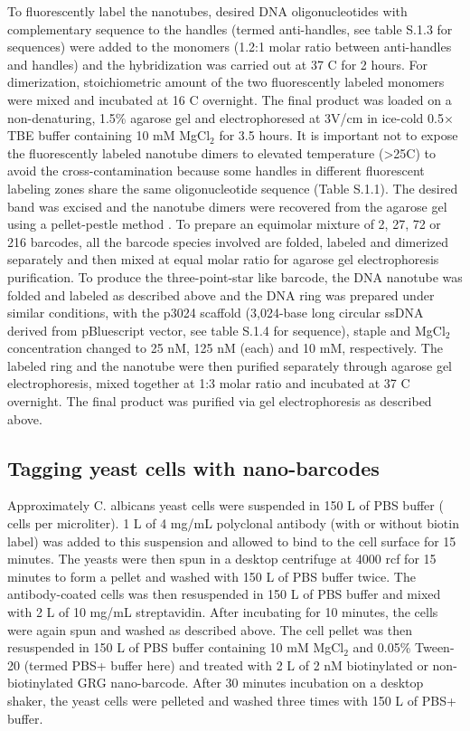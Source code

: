  To fluorescently label the nanotubes, desired DNA oligonucleotides with complementary sequence to the handles (termed anti-handles, see table S.1.3 for sequences) were added to the monomers (1.2:1 molar ratio between anti-handles and handles) and the hybridization was carried out at 37 \textdegree C for 2 hours. For dimerization, stoichiometric amount of the two fluorescently labeled monomers were mixed and incubated at 16 \textdegree C overnight. The final product was loaded on a non-denaturing, 1.5\% agarose gel and electrophoresed at 3V/cm in ice-cold 0.5× TBE buffer containing 10 mM MgCl$_2$ for 3.5 hours. It is important not to expose the fluorescently labeled nanotube dimers to elevated temperature (>25\textdegree C) to avoid the cross-contamination because some handles in different fluorescent labeling zones share the same oligonucleotide sequence (Table S.1.1). The desired band was excised and the nanotube dimers were recovered from the agarose gel using a pellet-pestle method \citep{kurien_extraction_2002}. To prepare an equimolar mixture of 2, 27, 72 or 216 barcodes, all the barcode species involved are folded, labeled and dimerized separately and then mixed at equal molar ratio for agarose gel electrophoresis purification. To produce the three-point-star like barcode, the DNA nanotube was folded and labeled as described above and the DNA ring was prepared under similar conditions, with the p3024 scaffold (3,024-base long circular ssDNA derived from pBluescript vector, see table S.1.4 for sequence), staple and MgCl$_2$ concentration changed to 25 nM, 125 nM (each) and 10 mM, respectively. The labeled ring and the nanotube were then purified separately through agarose gel electrophoresis, mixed together at 1:3 molar ratio and incubated at 37 \textdegree C overnight. The final product was purified via gel electrophoresis as described above.

\subsection{Tagging yeast cells with nano-barcodes}
Approximately  C. albicans yeast cells were suspended in 150 \textmu L of PBS buffer ( cells per microliter). 1 \textmu L of 4 mg/mL polyclonal antibody (with or without biotin label) was added to this suspension and allowed to bind to the cell surface for 15 minutes. The yeasts were then spun in a desktop centrifuge at 4000 rcf for 15 minutes to form a pellet and washed with 150 \textmu L of PBS buffer twice. The antibody-coated cells was then resuspended in 150 \textmu L of PBS buffer and mixed with 2 \textmu L of 10 mg/mL streptavidin. After incubating for 10 minutes, the cells were again spun and washed as described above. The cell pellet was then resuspended in 150 \textmu L of PBS buffer containing 10 mM MgCl$_2$ and 0.05\% Tween-20 (termed PBS+ buffer here) and treated with 2 \textmu L of 2 nM biotinylated or non-biotinylated GRG nano-barcode. After 30 minutes incubation on a desktop shaker, the yeast cells were pelleted and washed three times with 150 \textmu L of PBS+ buffer.

